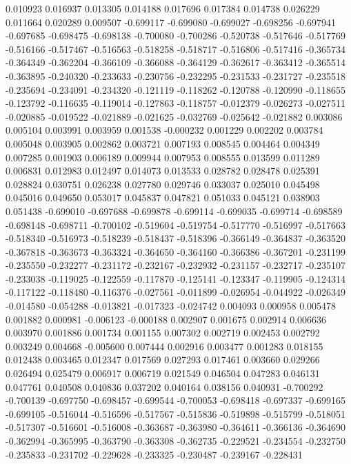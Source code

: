 0.010923
0.016937
0.013305
0.014188
0.017696
0.017384
0.014738
0.026229
0.011664
0.020289
0.009507
-0.699117
-0.699080
-0.699027
-0.698256
-0.697941
-0.697685
-0.698475
-0.698138
-0.700080
-0.700286
-0.520738
-0.517646
-0.517769
-0.516166
-0.517467
-0.516563
-0.518258
-0.518717
-0.516806
-0.517416
-0.365734
-0.364349
-0.362204
-0.366109
-0.366088
-0.364129
-0.362617
-0.363412
-0.365514
-0.363895
-0.240320
-0.233633
-0.230756
-0.232295
-0.231533
-0.231727
-0.235518
-0.235694
-0.234091
-0.234320
-0.121119
-0.118262
-0.120788
-0.120990
-0.118655
-0.123792
-0.116635
-0.119014
-0.127863
-0.118757
-0.012379
-0.026273
-0.027511
-0.020885
-0.019522
-0.021889
-0.021625
-0.032769
-0.025642
-0.021882
0.003086
0.005104
0.003991
0.003959
0.001538
-0.000232
0.001229
0.002202
0.003784
0.005048
0.003905
0.002862
0.003721
0.007193
0.008545
0.004464
0.004349
0.007285
0.001903
0.006189
0.009944
0.007953
0.008555
0.013599
0.011289
0.006831
0.012983
0.012497
0.014073
0.013533
0.028782
0.028478
0.025391
0.028824
0.030751
0.026238
0.027780
0.029746
0.033037
0.025010
0.045498
0.045016
0.049650
0.053017
0.045837
0.047821
0.051033
0.045121
0.038903
0.051438
-0.699010
-0.697688
-0.699878
-0.699114
-0.699035
-0.699714
-0.698589
-0.698148
-0.698711
-0.700102
-0.519604
-0.519754
-0.517770
-0.516997
-0.517663
-0.518340
-0.516973
-0.518239
-0.518437
-0.518396
-0.366149
-0.364837
-0.363520
-0.367818
-0.363673
-0.363324
-0.364650
-0.364160
-0.366386
-0.367201
-0.231199
-0.235550
-0.232277
-0.231172
-0.232167
-0.232932
-0.231157
-0.232717
-0.235107
-0.233038
-0.119025
-0.122559
-0.117870
-0.125141
-0.123347
-0.119905
-0.124314
-0.117122
-0.118480
-0.116376
-0.027561
-0.011899
-0.026954
-0.044922
-0.026349
-0.014580
-0.054288
-0.013821
-0.017323
-0.024742
0.004093
0.000958
0.005478
0.001882
0.000981
-0.006123
-0.000188
0.002907
0.001675
0.002914
0.006636
0.003970
0.001886
0.001734
0.001155
0.007302
0.002719
0.002453
0.002792
0.003249
0.004668
-0.005600
0.007444
0.002916
0.003477
0.001283
0.018155
0.012438
0.003465
0.012347
0.017569
0.027293
0.017461
0.003660
0.029266
0.026494
0.025479
0.006917
0.006719
0.021549
0.046504
0.047283
0.046131
0.047761
0.040508
0.040836
0.037202
0.040164
0.038156
0.040931
-0.700292
-0.700139
-0.697750
-0.698457
-0.699544
-0.700053
-0.698418
-0.697337
-0.699165
-0.699105
-0.516044
-0.516596
-0.517567
-0.515836
-0.519898
-0.515799
-0.518051
-0.517307
-0.516601
-0.516008
-0.363687
-0.363980
-0.364611
-0.366136
-0.364690
-0.362994
-0.365995
-0.363790
-0.363308
-0.362735
-0.229521
-0.234554
-0.232750
-0.235833
-0.231702
-0.229628
-0.233325
-0.230487
-0.239167
-0.228431
